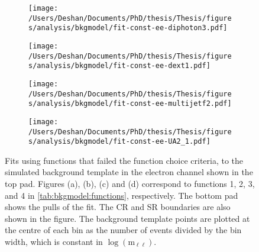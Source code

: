 \begin{figure}[h!]
    \centering
    \begin{subfigure}[b]{0.49\textwidth}
        \centering
        \texttt{[image: /Users/Deshan/Documents/PhD/thesis/Thesis/figures/analysis/bkgmodel/fit-const-ee-diphoton3.pdf]}
        \caption{}
        \label{fig:bkgmodel:fitstoMC3}
    \end{subfigure}
    \begin{subfigure}[b]{0.49\textwidth}
        \centering
        \texttt{[image: /Users/Deshan/Documents/PhD/thesis/Thesis/figures/analysis/bkgmodel/fit-const-ee-dext1.pdf]}
        \caption{}
        \label{fig:bkgmodel:fitstoMC4}
    \end{subfigure}
    \begin{subfigure}[b]{0.49\textwidth}
        \centering
        \texttt{[image: /Users/Deshan/Documents/PhD/thesis/Thesis/figures/analysis/bkgmodel/fit-const-ee-multijetf2.pdf]}
        \caption{}
        \label{fig:bkgmodel:fitstoMC5}
    \end{subfigure}
    \begin{subfigure}[b]{0.49\textwidth}
        \centering
        \texttt{[image: /Users/Deshan/Documents/PhD/thesis/Thesis/figures/analysis/bkgmodel/fit-const-ee-UA2\_1.pdf]}
        \caption{}
        \label{fig:bkgmodel:fitstoMC6}
    \end{subfigure}
    \caption[Fits to the simulated background template in the electron and muon channels using functions that did not pass the selection criteria]{Fits using functions that failed the function choice criteria, to the simulated background template in the electron channel shown in the top pad. Figures (a), (b), (c) and (d) correspond to functions 1, 2, 3, and 4 in \cref{tab:bkgmodel:functions}, respectively. The bottom pad shows the pulls of the fit. The CR and SR boundaries are also shown in the figure. The background template points are plotted at the centre of each bin as the number of events divided by the bin width, which is constant in $\log{(\text{m}_{\ell\ell})}$.}
    \label{fig:bkgmodel:badfitstomc}
\end{figure}

